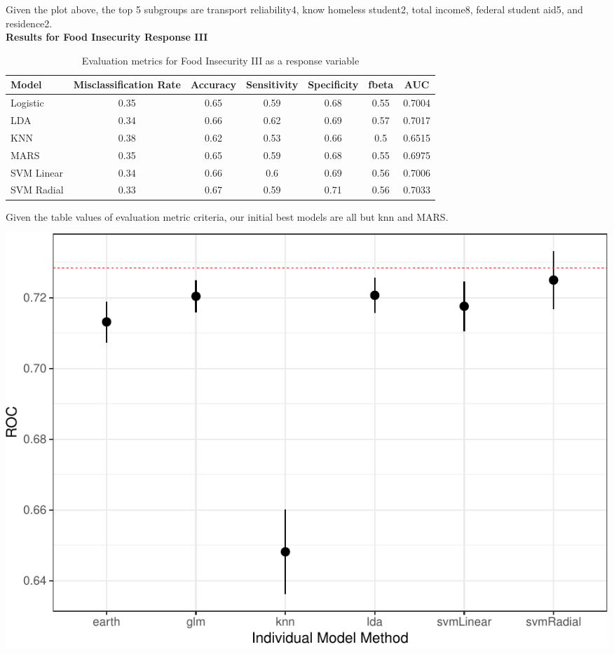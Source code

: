 \documentclass[
  10pt,
]{article}
\begin{document}
Given the plot above, the top 5 subgroups are transport reliability4, know homeless student2, total income8, federal student aid5, and residence2.\\

\textbf{Results for Food Insecurity Response III}

\begin{table}[H]

\caption{\label{tab:unnamed-chunk-25}Evaluation metrics for Food Insecurity III  as a response variable}
\centering
\fontsize{12}{14}\selectfont
\begin{tabular}[t]{lcccccc}
\toprule
Model & Misclassification Rate & Accuracy & Sensitivity & Specificity & fbeta & AUC\\
\midrule
Logistic & 0.35 & 0.65 & 0.59 & 0.68 & 0.55 & 0.7004\\
LDA & 0.34 & 0.66 & 0.62 & 0.69 & 0.57 & 0.7017\\
KNN & 0.38 & 0.62 & 0.53 & 0.66 & 0.5 & 0.6515\\
MARS & 0.35 & 0.65 & 0.59 & 0.68 & 0.55 & 0.6975\\
SVM Linear & 0.34 & 0.66 & 0.6 & 0.69 & 0.56 & 0.7006\\
SVM Radial & 0.33 & 0.67 & 0.59 & 0.71 & 0.56 & 0.7033\\
\bottomrule
\end{tabular}
\end{table}

Given the table values of evaluation metric criteria, our initial best models are all but knn and MARS.\\

\begin{center}\includegraphics{final_phase2_report_files/figure-latex/unnamed-chunk-26-1} \end{center}
\end{document}
